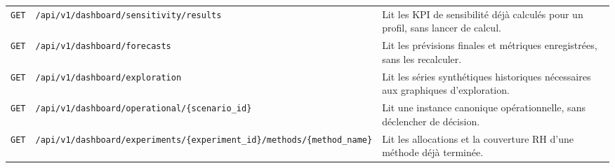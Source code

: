 \begin{table}[H]
{\begin{tabular}{lp{8.2cm}p{8.4cm}}
        \texttt{GET} & \texttt{/\allowbreak api/\allowbreak v1/\allowbreak dashboard/\allowbreak sensitivity/\allowbreak results} & Lit les KPI de sensibilité déjà calculés pour un profil, sans lancer de calcul. \\
        \texttt{GET} & \texttt{/\allowbreak api/\allowbreak v1/\allowbreak dashboard/\allowbreak forecasts} & Lit les prévisions finales et métriques enregistrées, sans les recalculer. \\
        \texttt{GET} & \texttt{/\allowbreak api/\allowbreak v1/\allowbreak dashboard/\allowbreak exploration} & Lit les séries synthétiques historiques nécessaires aux graphiques d'exploration. \\
        \texttt{GET} & \texttt{/\allowbreak api/\allowbreak v1/\allowbreak dashboard/\allowbreak operational/\allowbreak \{scenario\_id\}} & Lit une instance canonique opérationnelle, sans déclencher de décision. \\
        \texttt{GET} & \texttt{/\allowbreak api/\allowbreak v1/\allowbreak dashboard/\allowbreak experiments/\allowbreak \{experiment\_id\}/\allowbreak methods/\allowbreak \{method\_name\}} & Lit les allocations et la couverture RH d'une méthode déjà terminée. \\
        \bottomrule
    \end{tabular}}
\end{table}

